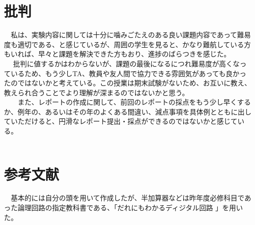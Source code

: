\documentclass{scrartcl}
\begin{document}
\section{批判}
\label{sec:orgd7117a2}
  　私は、実験内容に関しては十分に噛みごたえのある良い課題内容であって難易度も適切である、と感じているが、周囲の学生を見ると、かなり難航している方もいれば、早々と課題を解決できた方もおり、進捗のばらつきを感じた。\\
　  批判に値するかはわからないが、課題の最後になるにつれ難易度が高くなっているため、もう少しTA、教員や友人間で協力できる雰囲気があっても良かったのではないかと考えている。この授業は期末試験がないため、お互いに教え、教えられ合うことでより理解が深まるのではないかと思う。\\
　　また、レポートの作成に関して、前回のレポートの採点をもう少し早くするか、例年の、あるいはその年のよくある間違い、減点事項を具体例とともに出していただけると、円滑なレポート提出・採点ができるのではないかと感じている。\\
　　\\

\section{参考文献}
\label{sec:org3f37bae}
　基本的には自分の頭を用いて作成したが、半加算器などは昨年度必修科目であった論理回路の指定教科書である、「だれにもわかるディジタル回路 \cite{book1}」を用いた。\\


\printbibliography[title=References]\\
\end{document}
